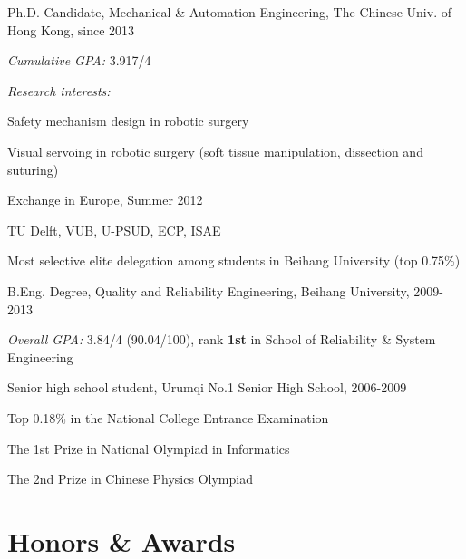 \documentclass[10pt,letterpaper]{article}
\renewenvironment{itemize}{
  \begin{list}{}{
    \setlength{\leftmargin}{1.5em}
    \setlength{\itemsep}{0.25em}
    \setlength{\parskip}{0pt}
    \setlength{\parsep}{0.25em}
  }
}{
  \end{list}
}
\begin{document}
\begin{itemize}
  \item Ph.D. Candidate, Mechanical \& Automation Engineering, The Chinese Univ. of Hong Kong, since 2013
    \begin{itemize}
    \item \emph{Cumulative GPA:} 3.917/4
    \item \emph{Research interests:}
      \begin{itemize}
      \item Safety mechanism design in robotic surgery
      \item Visual servoing in robotic surgery (soft tissue manipulation, dissection and suturing)
      \end{itemize}
    \end{itemize}
  \item Exchange in Europe, Summer 2012
    \begin{itemize}
    \item TU Delft, VUB, U-PSUD, ECP, ISAE
    \item Most selective elite delegation among students in Beihang University (top 0.75\%)
    \end{itemize}
  \item B.Eng. Degree, Quality and Reliability Engineering, Beihang University, 2009-2013
    \begin{itemize}
    \item \emph{Overall GPA:} 3.84/4 (90.04/100), rank \textbf{1st} in School of Reliability \& System Engineering
    \end{itemize}
  \item Senior high school student, Urumqi No.1 Senior High School, 2006-2009
    \begin{itemize}
    \item Top 0.18\% in the National College Entrance Examination
    \item The 1st Prize in National Olympiad in Informatics
    \item The 2nd Prize in Chinese Physics Olympiad
    \end{itemize}
\end{itemize}

\section*{Honors \& Awards}
\end{document}

